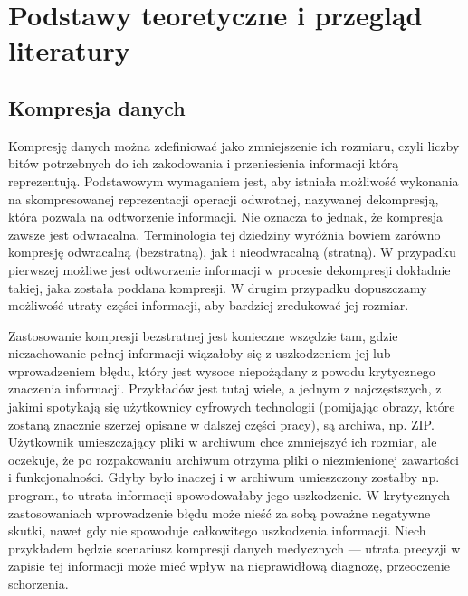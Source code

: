 \clearpage
\section{Podstawy teoretyczne i przegląd literatury}
\subsection{Kompresja danych}
Kompresję danych można zdefiniować jako zmniejszenie ich rozmiaru, czyli liczby bitów potrzebnych do ich zakodowania i przeniesienia informacji którą reprezentują. Podstawowym wymaganiem jest, aby istniała możliwość wykonania na skompresowanej reprezentacji operacji odwrotnej, nazywanej dekompresją, która pozwala na odtworzenie informacji. Nie oznacza to jednak, że kompresja zawsze jest odwracalna. Terminologia tej dziedziny wyróżnia bowiem zarówno kompresję odwracalną (bezstratną), jak i nieodwracalną (stratną). W przypadku pierwszej możliwe jest odtworzenie informacji w procesie dekompresji dokładnie takiej, jaka została poddana kompresji. W drugim przypadku dopuszczamy możliwość utraty części informacji, aby bardziej zredukować jej rozmiar.

Zastosowanie kompresji bezstratnej jest konieczne wszędzie tam, gdzie niezachowanie pełnej informacji wiązałoby się z uszkodzeniem jej lub wprowadzeniem błędu, który jest wysoce niepożądany z powodu krytycznego znaczenia informacji. Przykładów jest tutaj wiele, a jednym z najczęstszych, z jakimi spotykają się użytkownicy cyfrowych technologii (pomijając obrazy, które zostaną znacznie szerzej opisane w dalszej części pracy), są archiwa, np. ZIP. Użytkownik umieszczający pliki w archiwum chce zmniejszyć ich rozmiar, ale oczekuje, że po rozpakowaniu archiwum otrzyma pliki o niezmienionej zawartości i funkcjonalności. Gdyby było inaczej i w archiwum umieszczony zostałby np. program, to utrata informacji spowodowałaby jego uszkodzenie. W krytycznych zastosowaniach wprowadzenie błędu może nieść za sobą poważne negatywne skutki, nawet gdy nie spowoduje całkowitego uszkodzenia informacji. Niech przykładem będzie scenariusz kompresji danych medycznych --- utrata precyzji w zapisie tej informacji może mieć wpływ na nieprawidłową diagnozę, przeoczenie schorzenia.


